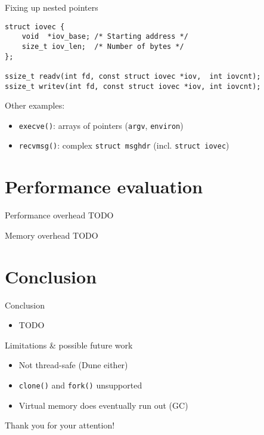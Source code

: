 \documentclass[10pt]{beamer}
\begin{document}
\begin{frame}[fragile]{Fixing up nested pointers}
    \begin{lstlisting}
struct iovec {
    void  *iov_base; /* Starting address */
    size_t iov_len;  /* Number of bytes */
};

ssize_t readv(int fd, const struct iovec *iov,  int iovcnt);
ssize_t writev(int fd, const struct iovec *iov, int iovcnt);
    \end{lstlisting}

    \pause

    Other examples:
    \begin{itemize}
        \item \lstinline!execve()!: arrays of pointers (\lstinline!argv!, \lstinline!environ!)
        \item \lstinline!recvmsg()!: complex \lstinline!struct msghdr! (incl. \lstinline!struct iovec!)
    \end{itemize}
\end{frame}

\section{Performance evaluation}

\begin{frame}{Performance overhead}
    TODO
\end{frame}

\begin{frame}{Memory overhead}
    TODO
\end{frame}

\section{Conclusion}

\begin{frame}{Conclusion}
    \begin{itemize}
        \item TODO
    \end{itemize}
\end{frame}

\begin{frame}[fragile]{Limitations \& possible future work}
    \begin{itemize}
        \item Not thread-safe (Dune either)
        \item \lstinline!clone()! and \lstinline!fork()! unsupported
        \item Virtual memory does eventually run out (GC)
    \end{itemize}
\end{frame}

\begin{frame}[standout]
    \Huge
    \centering
    Thank you for your attention!
\end{frame}
\end{document}
